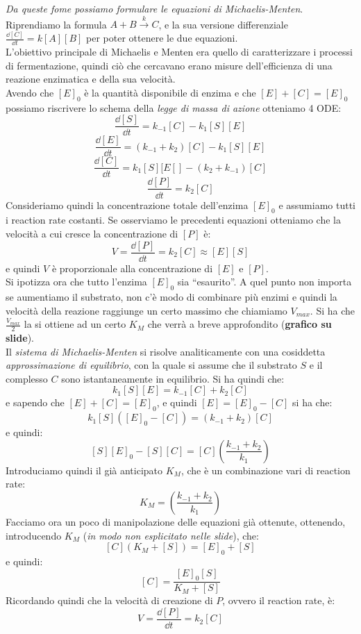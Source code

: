 \documentclass[a4paper,12pt, oneside]{book}
\begin{document}
\textit{Da queste fome possiamo formulare le equazioni di Michaelis-Menten}.\\
Riprendiamo la formula $A+B\stackrel{k}{\to}C$, e la sua versione
differenziale $\frac{\dd{[C]}}{\dd{t}}=k[A][B]$ per poter ottenere le due
equazioni. \\
L'obiettivo principale di Michaelis e Menten era quello di caratterizzare i
processi di fermentazione, quindi ciò che cercavano erano misure dell'efficienza
di una reazione enzimatica e della sua velocità. \\
Avendo che $[E]_0$ è la quantità disponibile di enzima e che $[E]+[C]=[E]_0$
possiamo riscrivere lo schema della \textit{legge di massa di azione} otteniamo
4 ODE:
\[\frac{\dd{[S]}}{\dd{t}}=k_{-1}[C]-k_1[S][E]\]
\[\frac{\dd{[E]}}{\dd{t}}=(k_{-1}+k_2)[C]-k_1[S][E]\]
\[\frac{\dd{[C]}}{\dd{t}}=k_1[S][E[]-(k_2+k_{-1})[C]\]
\[\frac{\dd{[P]}}{\dd{t}}=k_2[C]\]
Consideriamo quindi la concentrazione totale dell'enzima $[E]_0$
e assumiamo tutti i reaction rate costanti. Se osserviamo le precedenti
equazioni otteniamo che la velocità a cui cresce la concentrazione di $[P]$ è:
\[V=\frac{\dd{[P]}}{\dd{t}}=k_2[C]\approx [E][S]\]
e quindi $V$ è proporzionale alla concentrazione di $[E]$ e $[P]$.\\
Si ipotizza ora che tutto l'enzima $[E]_0$ sia ``esaurito''. A  quel punto non
importa se aumentiamo il substrato, non c'è modo di combinare più enzimi e
quindi la velocità della reazione raggiunge un certo massimo che chiamiamo
$V_{max}$. Si ha che $\frac{V_{max}}{2}$ la si ottiene ad un certo $K_M$ che
verrà a breve approfondito (\textbf{grafico su slide}).\\
Il \textit{sistema di Michaelis-Menten} si risolve analiticamente con una
cosiddetta \textit{approssimazione di equilibrio}, con la quale si assume che il
substrato $S$ e il complesso $C$ sono istantaneamente in equilibrio. Si ha
quindi che:
\[k_1[S][E]=k_{-1}[C]+k_2[C]\]
e sapendo che $[E]+[C]=[E]_0$, e quindi $[E] = [E]_0-[C]$ si ha che:
\[k_1[S]([E]_0-[C])=(k_{-1}+k_2)[C]\]
e quindi:
\[[S][E]_0-[S][C]=[C]\left(\frac{k_{-1}+k_2}{k_1}\right)\]
Introduciamo quindi il già anticipato $K_M$, che è un combinazione vari di
reaction rate:
\[K_M=\left(\frac{k_{-1}+k_2}{k_1}\right)\]
Facciamo ora un poco di manipolazione delle equazioni già ottenute, ottenendo,
introducendo $K_M$ (\textit{in modo non esplicitato nelle slide}), che:
\[[C](K_M+[S])=[E]_0+[S]\]
e quindi:
\[[C]=\frac{[E]_0[S]}{K_M+[S]}\]
Ricordando quindi che la velocità di creazione di $P$, ovvero il reaction rate,
è:
\[V=\frac{\dd{[P]}}{\dd{t}}=k_2[C]\]
\end{document}
